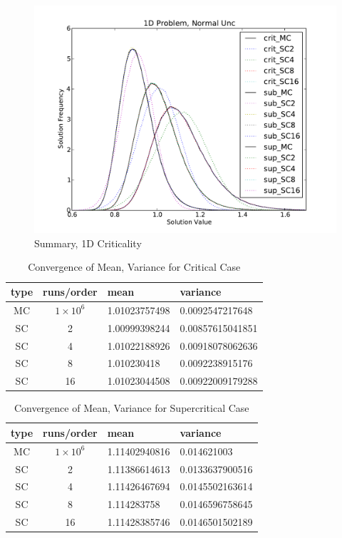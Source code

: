 \begin{figure}[h!]
\centering
   \includegraphics[width=.75\textwidth]{../graphics/1dall_normal_pdfs}
   \caption{Summary, 1D Criticality}
   \label{1d_all}
\end{figure}

\begin{table}
\begin{center}
\begin{tabular}{c c|l l}
type & runs/order & mean & variance \\ \hline
MC & $1\times10^6$ & 1.01023757498 & 0.0092547217648 \\
SC & 2 & 1.00999398244 & 0.00857615041851 \\
SC & 4 & 1.01022188926 & 0.00918078062636\\
SC & 8 & 1.010230418 & 0.0092238915176 \\
SC & 16 & 1.01023044508 & 0.00922009179288
\end{tabular}
\end{center}
\caption{Convergence of Mean, Variance for Critical Case}
\label{tab:1dcrit}
\end{table}

\begin{table}
\begin{center}
\begin{tabular}{c c|l l}
type & runs/order & mean & variance \\ \hline
MC & $1\times10^6$ & 1.11402940816 & 0.014621003 \\
SC & 2 & 1.11386614613 &0.0133637900516 \\
SC & 4 & 1.11426467694 &0.0145502163614 \\
SC & 8 & 1.114283758 &0.0146596758645 \\
SC & 16 & 1.11428385746 &0.0146501502189
\end{tabular}
\end{center}
\caption{Convergence of Mean, Variance for Supercritical Case}
\label{tab:1dsup}
\end{table}

